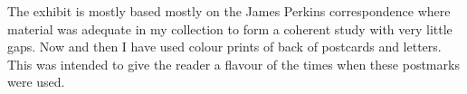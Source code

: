 The exhibit is mostly based mostly on the James Perkins correspondence 
where material was adequate in my collection to form a coherent study with very 
little gaps. Now and then I have used colour prints of back of postcards and letters. 
This was intended to give the reader a flavour of the times when these 
postmarks were used.

                                                                                                                                              


 

 
                                
